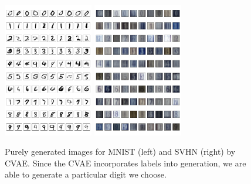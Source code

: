 \documentclass[10pt]{article}
\begin{document}
\begin{figure}[!ht] 
\centering
\includegraphics[width=0.35\textwidth]{images/by_label.png}
\includegraphics[width=0.35\textwidth]{images/svhn_cvae_fc_label_gen.png}
\caption{Purely generated images for MNIST (left) and SVHN (right) by CVAE. Since the CVAE incorporates labels into generation, we are able to generate a particular digit we choose.}
\label{figure:cvae_label}
\end{figure}
\end{document}
